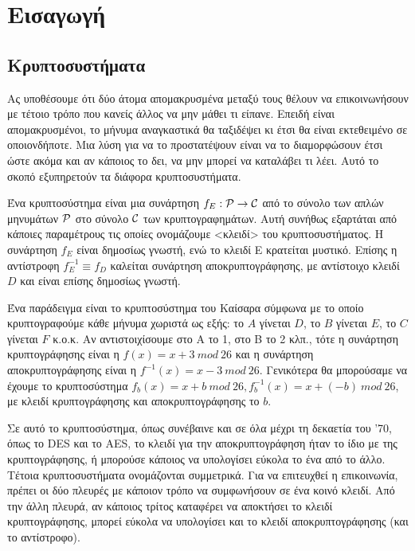



\section{Εισαγωγή}

\subsection{Κρυπτοσυστήματα}

Ας υποθέσουμε ότι δύο άτομα απομακρυσμένα μεταξύ τους θέλουν να επικοινωνήσουν με τέτοιο τρόπο που κανείς άλλος να μην μάθει τι είπανε. Επειδή είναι απομακρυσμένοι, το μήνυμα αναγκαστικά θα ταξιδέψει κι έτσι θα είναι εκτεθειμένο σε οποιονδήποτε. Μια λύση για να το προστατέψουν είναι να το διαμορφώσουν έτσι ώστε ακόμα και αν κάποιος το δει, να μην μπορεί να καταλάβει τι λέει. Αυτό το σκοπό εξυπηρετούν τα διάφορα κρυπτοσυστήματα.

Ένα κρυπτοσύστημα είναι μια συνάρτηση $f_{E}:\cal P \rightarrow C$ από το σύνολο των απλών μηνυμάτων $\cal P$ στο σύνολο $\cal C$ των κρυπτογραφημάτων. Αυτή συνήθως εξαρτάται από κάποιες παραμέτρους τις οποίες ονομάζουμε <κλειδί> του κρυπτοσυστήματος. Η συνάρτηση $f_{E}$ είναι δημοσίως γνωστή, ενώ το κλειδί Ε κρατείται μυστικό. Επίσης η αντίστροφη $f^{-1}_{E}\equiv f_{D}$ καλείται συνάρτηση αποκρυπτογράφησης, με αντίστοιχο κλειδί $D$ και είναι επίσης δημοσίως γνωστή.
 
Ένα παράδειγμα είναι το κρυπτοσύστημα του Καίσαρα σύμφωνα με το οποίο κρυπτογραφούμε κάθε μήνυμα χωριστά ως εξής: το $A$ γίνεται $D$, το $B$ γίνεται $E$, το  $C$ γίνεται $F$ κ.ο.κ. Αν αντιστοιχίσουμε στο Α το 1, στο Β το 2 κλπ., τότε η συνάρτηση κρυπτογράφησης είναι η $f(x)=x+3 \ mod\ 26$ και η συνάρτηση αποκρυπτογράφησης είναι η $f^{-1}(x)=x-3\ mod\ 26$. Γενικότερα θα μπορούσαμε να έχουμε το κρυπτοσύστημα $f_{b}(x)=x+b\ mod\ 26, f^{-1}_{b}(x)=x+(-b)\ mod\ 26$, με κλειδί κρυπτογράφησης και αποκρυπτογράφησης το $b$.

Σε αυτό το κρυπτοσύστημα, όπως συνέβαινε και σε όλα μέχρι τη δεκαετία του '70, όπως το DES και το AES, το κλειδί για την αποκρυπτογράφηση ήταν το ίδιο με της κρυπτογράφησης, ή μπορούσε κάποιος να υπολογίσει εύκολα το ένα από το άλλο. Τέτοια κρυπτοσυστήματα ονομάζονται συμμετρικά. Για να επιτευχθεί η επικοινωνία, πρέπει οι δύο πλευρές με κάποιον τρόπο να συμφωνήσουν σε ένα κοινό κλειδί. Από την άλλη πλευρά, αν κάποιος τρίτος καταφέρει να αποκτήσει το κλειδί κρυπτογράφησης, μπορεί εύκολα να υπολογίσει και το κλειδί αποκρυπτογράφησης (και το αντίστροφο). 

